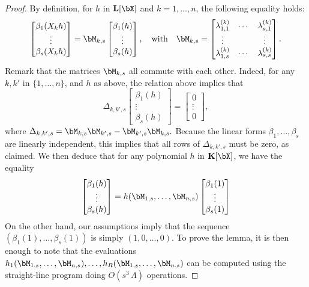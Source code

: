 \documentclass[12pt]{article}
\begin{document}
\begin{proof}
  By definition, for $h$ in $\LL[\bX]$ and $k=1,\dots,n$, the following equality
  holds:
$$
  \begin{bmatrix}
    \beta_1(X_k h)\\
    \vdots\\
    \beta_s(X_k h)
  \end{bmatrix}=
\bM_{k,s}
  \begin{bmatrix}
    \beta_1(h)\\
    \vdots\\
    \beta_s(h)
  \end{bmatrix},
\quad\text{with}\quad
\bM_{k,s}= \begin{bmatrix}
    \lambda^{(k)}_{1,1} & \cdots & \lambda^{(k)}_{s,1}\\
    \vdots && \vdots \\
    \lambda^{(k)}_{1,s} & \cdots & \lambda^{(k)}_{s,s}
  \end{bmatrix}.
$$ 
 Remark that the matrices $\bM_{k,s}$ all commute with each other. Indeed, 
for any $k,k'$ in $\{1,\dots,n\}$, and $h$ as above, the relation above implies
that 
$$
\Delta_{k,k',s}
  \begin{bmatrix}
    \beta_1(h)\\
    \vdots\\
    \beta_s(h)
  \end{bmatrix} =
  \begin{bmatrix}
0\\ \vdots \\ 0 
  \end{bmatrix},
$$
where $\Delta_{k,k',s} = \bM_{k,s}\bM_{k',s}-\bM_{k',s}\bM_{k,s}.$ Because 
the linear forms $\beta_1,\dots,\beta_s$ are linearly independent, this implies
that all rows of $\Delta_{k,k',s}$ must be zero, as claimed.
We then deduce that for any polynomial $h$ in $\KK[\bX]$, we have
the equality
$$  \begin{bmatrix}
    \beta_1(h)\\
    \vdots\\
    \beta_s(h)
  \end{bmatrix} =
h(\bM_{1,s},\dots,\bM_{n,s})   \begin{bmatrix}
    \beta_1(1)\\
    \vdots\\
    \beta_s(1)
  \end{bmatrix} $$ On the other hand, our assumptions imply that the
  sequence $(\beta_1(1),\dots,\beta_s(1))$ is simply $(1,0,\dots,0)$.
  To prove the lemma, it is then enough to note that the evaluations \sloppy
  $h_1(\bM_{1,s},\dots,\bM_{n,s}),\dots,h_R(\bM_{1,s},\dots,\bM_{n,s})$
  can be computed using the straight-line program doing
  $O(s^3\,\Lambda)$ operations.
\end{proof}
\end{document}
